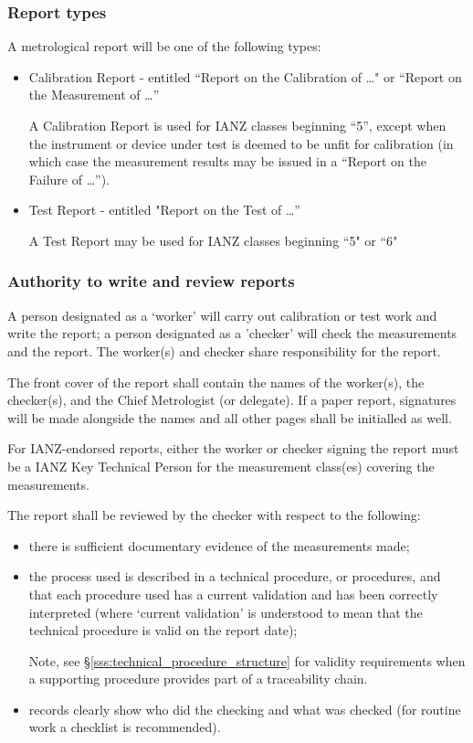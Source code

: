 \subsubsection{Report types}
A metrological report will be one of the following types:
\begin{itemize}
\item Calibration Report - entitled ``Report on the Calibration of \ldots" or ``Report on the Measurement of \ldots'' 

A Calibration Report is used for IANZ classes beginning ``5'', except when the instrument or device under test is deemed to be unfit for calibration (in which case the measurement results may be issued in a ``Report on the Failure of \ldots'').

\item Test Report - entitled "Report on the Test of \ldots''  

A Test Report may be used for IANZ classes beginning ``5" or ``6"
\end{itemize} 

\subsubsection{Authority to write and review reports}
A person designated as a `worker' will carry out calibration or test work and write the report; a person designated as a 'checker' will check the measurements and the report. The worker(s) and checker share responsibility for the report.

The front cover of the report shall contain the names of the worker(s), the checker(s), and the Chief Metrologist (or delegate). If a paper report, signatures will be made alongside the names and all other pages shall be initialled as well.

For IANZ-endorsed reports, either the worker or checker signing the report must be a IANZ Key Technical Person for the measurement class(es) covering the measurements.

The report shall be reviewed by the checker with respect to the following: 
\begin{itemize}
\item there is sufficient documentary evidence of the measurements made;
\item the process used is described in a technical procedure, or procedures, and that each procedure used has a current validation and has been correctly interpreted (where `current validation' is understood to mean that the technical procedure is valid on the report date);

Note, see \S\ref{sss:technical_procedure_structure} for validity requirements when a supporting procedure provides part of a traceability chain.

\item records clearly show who did the checking and what was checked (for routine work a checklist is recommended).
\end{itemize} 

